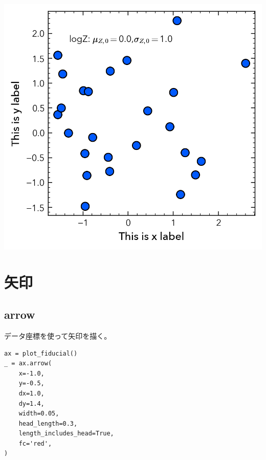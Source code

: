 \documentclass[a4paper, 10pt, notitlepage, twocolumn, uplatex, oneside, dvipdfmx]{jsarticle}
\begin{document}
\begin{center}
\includegraphics[width=1.0\linewidth]{./obipy-resources/params_text_fstring_latex.png}
\end{center}
\section{矢印}
\label{sec:orgd7b1a71}
\subsection{arrow}
\label{sec:org4179615}
データ座標を使って矢印を描く。
\begin{verbatim}
ax = plot_fiducial()
_ = ax.arrow(
    x=-1.0,
    y=-0.5,
    dx=1.0,
    dy=1.4,
    width=0.05,
    head_length=0.3,
    length_includes_head=True,
    fc='red',
)
\end{verbatim}
\end{document}
